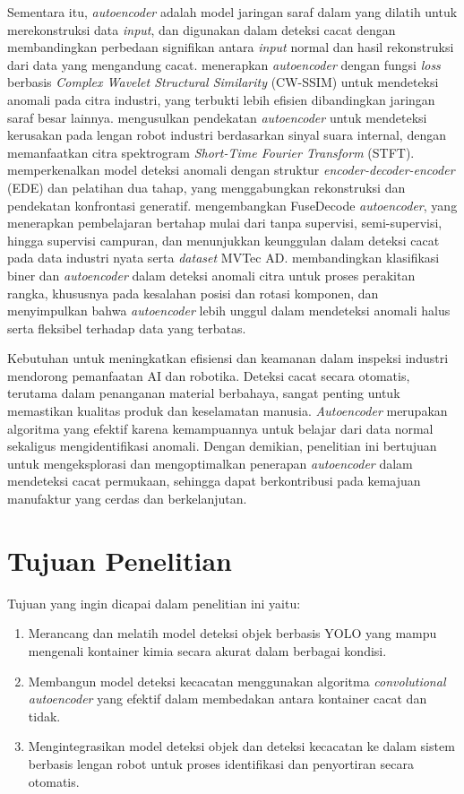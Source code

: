 Sementara itu, \textit{autoencoder} adalah model jaringan saraf dalam
yang dilatih untuk merekonstruksi data \textit{input}, dan digunakan
dalam deteksi cacat dengan membandingkan perbedaan signifikan antara
\textit{input} normal dan hasil rekonstruksi dari data yang
mengandung cacat. \citet{14} menerapkan \textit{autoencoder} dengan
fungsi \textit{loss} berbasis \textit{Complex Wavelet Structural
Similarity} (CW-SSIM)
untuk mendeteksi anomali pada citra industri, yang terbukti lebih
efisien dibandingkan jaringan saraf besar lainnya. \citet{15}
mengusulkan pendekatan \textit{autoencoder} untuk mendeteksi kerusakan
pada lengan robot industri berdasarkan sinyal suara internal, dengan
memanfaatkan citra spektrogram \textit{Short-Time Fourier Transform}
(STFT). \citet{16} memperkenalkan model
deteksi anomali dengan struktur \textit{encoder-decoder-encoder}
(EDE) dan pelatihan dua tahap, yang
menggabungkan rekonstruksi dan pendekatan konfrontasi generatif.
\citet{17} mengembangkan FuseDecode \textit{autoencoder}, yang
menerapkan pembelajaran bertahap mulai dari tanpa supervisi,
semi-supervisi, hingga supervisi campuran, dan menunjukkan keunggulan
dalam deteksi cacat pada data industri nyata serta \textit{dataset}
MVTec AD. \citet{18} membandingkan klasifikasi biner
dan \textit{autoencoder} dalam deteksi anomali citra untuk proses
perakitan rangka, khususnya pada kesalahan posisi dan rotasi komponen, dan
menyimpulkan bahwa \textit{autoencoder} lebih unggul dalam mendeteksi anomali
halus serta fleksibel terhadap data yang terbatas.

Kebutuhan untuk meningkatkan efisiensi dan keamanan dalam inspeksi
industri mendorong pemanfaatan AI dan robotika. Deteksi cacat secara
otomatis, terutama dalam penanganan material berbahaya, sangat
penting untuk memastikan kualitas produk dan keselamatan manusia.
\textit{Autoencoder} merupakan algoritma yang efektif karena kemampuannya
untuk belajar dari data normal sekaligus mengidentifikasi anomali.
Dengan demikian, penelitian ini bertujuan untuk mengeksplorasi dan
mengoptimalkan penerapan \textit{autoencoder} dalam mendeteksi cacat
permukaan, sehingga dapat berkontribusi pada kemajuan manufaktur yang
cerdas dan berkelanjutan.

\vspace{1em}

\section{Tujuan Penelitian}
Tujuan yang ingin dicapai dalam penelitian ini yaitu:
\begin{enumerate}
  \item Merancang dan melatih model deteksi objek berbasis YOLO yang
    mampu mengenali kontainer kimia secara akurat dalam berbagai kondisi.
  \item Membangun model deteksi kecacatan menggunakan algoritma
    \textit{convolutional autoencoder} yang efektif dalam membedakan antara
    kontainer cacat dan tidak.
  \item Mengintegrasikan model deteksi objek dan deteksi kecacatan ke
    dalam sistem berbasis lengan robot untuk proses identifikasi dan
    penyortiran secara otomatis.
\end{enumerate}


